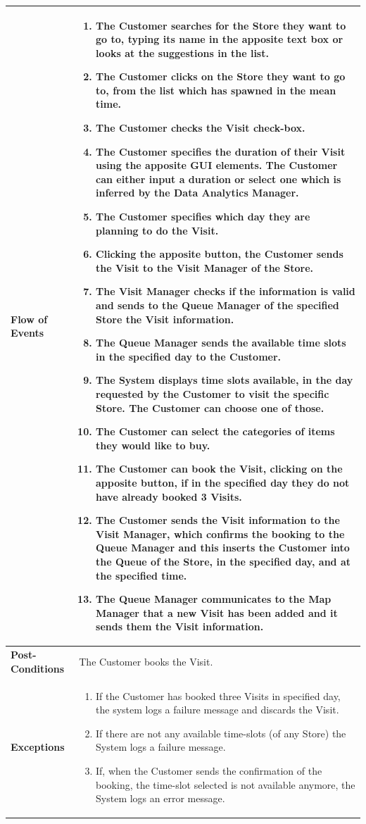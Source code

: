 \documentclass[a4paper, 12pt, oneside]{article}
\begin{document}
\begin{tabularx}{\linewidth}{| l | X |}
	\hline
	\textbf{Flow of Events} & \parbox{0.7\textwidth}{	
		\begin{enumerate}
			\item The Customer searches for the Store they want to go to, typing its name in the apposite text box or looks at the suggestions in the list.
			\item The Customer clicks on the Store they want to go to, from the list which has spawned in the mean time.
			\item The Customer checks the Visit check-box.
			\item The Customer specifies the duration of their Visit using the apposite GUI elements. The Customer can either input a duration or select one which is inferred by the Data Analytics Manager.
			\item The Customer specifies which day they are planning to do the Visit.
			\item Clicking the apposite button, the Customer sends the Visit to the Visit Manager of the Store.
			\item The Visit Manager checks if the information is valid and sends to the Queue Manager of the specified Store the Visit information.
			\item The Queue Manager sends the available time slots in the specified day to the Customer.
			\item The System displays time slots available, in the day requested by the Customer to visit the specific Store. The Customer can choose one of those.
			\item The Customer can select the categories of items they would like to buy.
			\item The Customer can book the Visit, clicking on the apposite button, if in the specified day they do not have already booked 3 Visits.
			\item The Customer sends the Visit information to the Visit Manager, which confirms the booking to the Queue Manager and this inserts the Customer into the Queue of the Store, in the specified day, and at the specified time.
			\item The Queue Manager communicates to the Map Manager that a new Visit has been added and it sends them the Visit information.
	\end{enumerate}}\\
	
	\hline
	\textbf{Post-Conditions} & The Customer books the Visit.\\
	
	\hline
	\textbf{Exceptions} & \parbox{0.7\textwidth}{ \begin{enumerate}
			\item If the Customer has booked three Visits in specified day, the system logs a failure message and discards the Visit.
			\item If there are not any available time-slots (of any Store) the System logs a failure message.
			\item If, when the Customer sends the confirmation of the booking, the time-slot selected is not available anymore, the System logs an error message.
		\end{enumerate}}\\


\end{tabularx}
\end{document}

